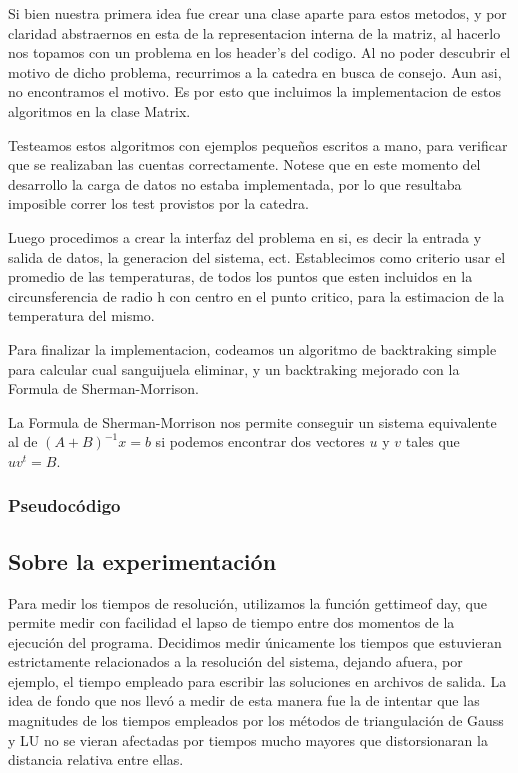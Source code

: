 Si bien nuestra primera idea fue crear una clase aparte para estos metodos, y por claridad abstraernos en esta de la 
representacion interna de la matriz, al hacerlo nos topamos con un problema en los header's del codigo. Al no poder descubrir el motivo
de dicho problema, recurrimos a la catedra en busca de consejo. Aun asi, no encontramos el motivo. Es por esto que incluimos la implementacion de
estos algoritmos en la clase Matrix. 

Testeamos estos algoritmos con ejemplos peque\~nos escritos a mano, para verificar que se realizaban las cuentas correctamente. Notese que en 
este momento del desarrollo la carga de datos no estaba implementada, por lo que resultaba imposible correr los test provistos por la catedra.

Luego procedimos a crear la interfaz del problema en si, es decir la entrada y salida de datos, la generacion
del sistema, ect. Establecimos como criterio usar el promedio de las temperaturas, de todos los puntos que esten
incluidos en la circunsferencia de radio h con centro en el punto critico,
para la estimacion de la temperatura del mismo. 

Para finalizar la implementacion, codeamos un algoritmo de backtraking simple para calcular cual sanguijuela eliminar,
y un backtraking mejorado con la Formula de Sherman-Morrison. 

La Formula de Sherman-Morrison nos permite conseguir un sistema equivalente al de $(A+B)^{-1}x=b$ si podemos encontrar dos vectores $u$ y $v$
tales que $uv^t=B$.



\subsubsection{Pseudoc\'odigo}

\subsection{Sobre la experimentaci\'on}

Para medir los tiempos de resoluci\'on, utilizamos la funci\'on gettimeof day, que permite medir con
facilidad el lapso de tiempo entre dos momentos de la ejecuci\'on del programa. Decidimos medir
\'unicamente los tiempos que estuvieran estrictamente relacionados a la resoluci\'on del sistema,
dejando afuera, por ejemplo, el tiempo empleado para escribir las soluciones en archivos de salida. La
idea de fondo que nos llev\'o a medir de esta manera fue la de intentar que las magnitudes de los tiempos
empleados por los m\'etodos de triangulaci\'on de Gauss y LU no se vieran afectadas por tiempos mucho
mayores que distorsionaran la distancia relativa entre ellas.

